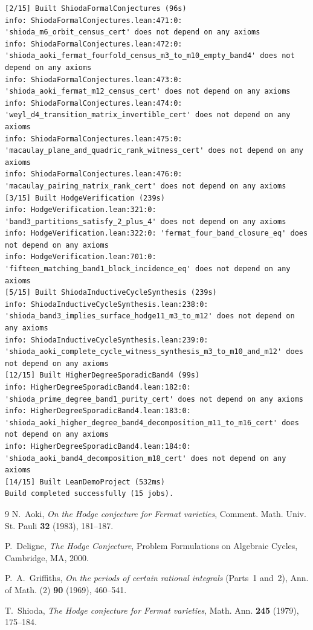 \documentclass[11pt,a4paper]{article}
\begin{document}
\begin{lstlisting}[language={},basicstyle=\ttfamily\scriptsize,caption={Raw \texttt{lake clean \&\& lake build} and \texttt{\#print axioms} output for Paper~1 theorems.}]
[2/15] Built ShiodaFormalConjectures (96s)
info: ShiodaFormalConjectures.lean:471:0: 'shioda_m6_orbit_census_cert' does not depend on any axioms
info: ShiodaFormalConjectures.lean:472:0: 'shioda_aoki_fermat_fourfold_census_m3_to_m10_empty_band4' does not depend on any axioms
info: ShiodaFormalConjectures.lean:473:0: 'shioda_aoki_fermat_m12_census_cert' does not depend on any axioms
info: ShiodaFormalConjectures.lean:474:0: 'weyl_d4_transition_matrix_invertible_cert' does not depend on any axioms
info: ShiodaFormalConjectures.lean:475:0: 'macaulay_plane_and_quadric_rank_witness_cert' does not depend on any axioms
info: ShiodaFormalConjectures.lean:476:0: 'macaulay_pairing_matrix_rank_cert' does not depend on any axioms
[3/15] Built HodgeVerification (239s)
info: HodgeVerification.lean:321:0: 'band3_partitions_satisfy_2_plus_4' does not depend on any axioms
info: HodgeVerification.lean:322:0: 'fermat_four_band_closure_eq' does not depend on any axioms
info: HodgeVerification.lean:701:0: 'fifteen_matching_band1_block_incidence_eq' does not depend on any axioms
[5/15] Built ShiodaInductiveCycleSynthesis (239s)
info: ShiodaInductiveCycleSynthesis.lean:238:0: 'shioda_band3_implies_surface_hodge11_m3_to_m12' does not depend on any axioms
info: ShiodaInductiveCycleSynthesis.lean:239:0: 'shioda_aoki_complete_cycle_witness_synthesis_m3_to_m10_and_m12' does not depend on any axioms
[12/15] Built HigherDegreeSporadicBand4 (99s)
info: HigherDegreeSporadicBand4.lean:182:0: 'shioda_prime_degree_band1_purity_cert' does not depend on any axioms
info: HigherDegreeSporadicBand4.lean:183:0: 'shioda_aoki_higher_degree_band4_decomposition_m11_to_m16_cert' does not depend on any axioms
info: HigherDegreeSporadicBand4.lean:184:0: 'shioda_aoki_band4_decomposition_m18_cert' does not depend on any axioms
[14/15] Built LeanDemoProject (532ms)
Build completed successfully (15 jobs).
\end{lstlisting}

\begin{thebibliography}{9}
N.~Aoki, \emph{On the Hodge conjecture for Fermat varieties}, Comment. Math. Univ. St. Pauli \textbf{32} (1983), 181--187.

P.~Deligne, \emph{The Hodge Conjecture}, Problem Formulations on Algebraic Cycles, Cambridge, MA, 2000.

P.~A.~Griffiths, \emph{On the periods of certain rational integrals} (Parts~1 and~2), Ann. of Math. (2) \textbf{90} (1969), 460--541.

T.~Shioda, \emph{The Hodge conjecture for Fermat varieties}, Math. Ann. \textbf{245} (1979), 175--184.
\end{thebibliography}
\end{document}
